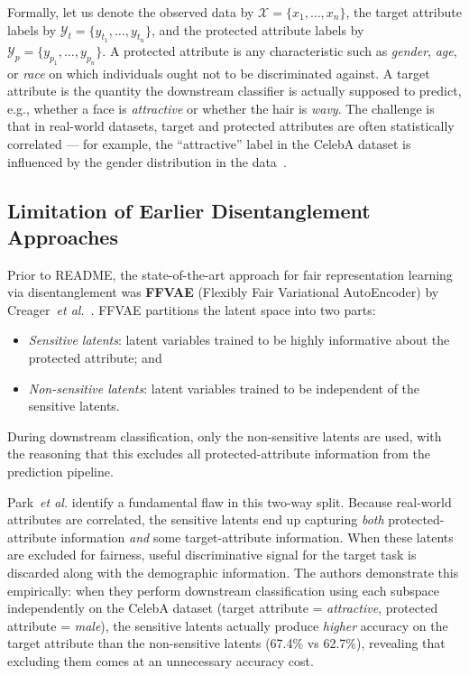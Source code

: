 Formally, let us denote the observed data by $\mathcal{X} = \{x_1, \ldots, x_n\}$, the target
attribute labels by $\mathcal{Y}_t = \{y_{t_1}, \ldots, y_{t_n}\}$, and the protected attribute
labels by $\mathcal{Y}_p = \{y_{p_1}, \ldots, y_{p_n}\}$. A protected attribute is any characteristic
such as \emph{gender}, \emph{age}, or \emph{race} on which individuals ought not to be
discriminated against. A target attribute is the quantity the downstream classifier is actually
supposed to predict, e.g., whether a face is \emph{attractive} or whether the hair is
\emph{wavy}. The challenge is that in real-world datasets, target and protected attributes are
often statistically correlated --- for example, the ``attractive'' label in the CelebA dataset is
influenced by the gender distribution in the data~\cite{park2020readme}.

\subsection{Limitation of Earlier Disentanglement Approaches}
\label{ssec:readme-ffvae-limitation}

Prior to README, the state-of-the-art approach for fair representation learning via disentanglement was
\textbf{FFVAE} (Flexibly Fair Variational AutoEncoder) by Creager~\emph{et al.}~\cite{creager2019ffvae}.
FFVAE partitions the latent space into two parts:
\begin{itemize}
    \item \emph{Sensitive latents}: latent variables trained to be highly informative about the
          protected attribute; and
    \item \emph{Non-sensitive latents}: latent variables trained to be independent of the sensitive
          latents.
\end{itemize}
During downstream classification, only the non-sensitive latents are used, with the reasoning that
this excludes all protected-attribute information from the prediction pipeline.

Park~\emph{et al.} identify a fundamental flaw in this two-way split. Because real-world attributes
are correlated, the sensitive latents end up capturing \emph{both} protected-attribute information
\emph{and} some target-attribute information. When these latents are excluded for fairness, useful
discriminative signal for the target task is discarded along with the demographic information. The
authors demonstrate this empirically: when they perform downstream classification using each
subspace independently on the CelebA dataset (target attribute = \emph{attractive}, protected
attribute = \emph{male}), the sensitive latents actually produce \emph{higher} accuracy on the
target attribute than the non-sensitive latents (67.4\% vs 62.7\%), revealing that excluding them
comes at an unnecessary accuracy cost.

